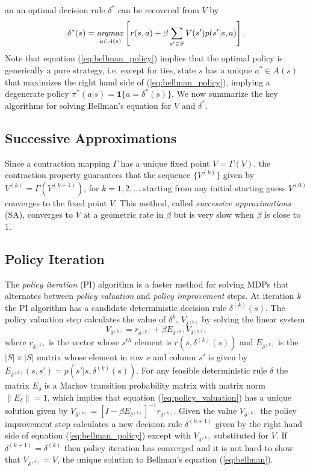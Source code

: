 an an optimal decision rule $\delta^*$ can be recovered from $V$ by
\begin{equation}
       \delta^*(s) = \mathop{\it argmax}_{a \in A(s)}\left[ r(s,a)+\beta \sum_{s' \in S} V(s')p(s'|s,a)\right].
\label{eq:bellman_policy}
\end{equation}
Note that equation (\ref{eq:bellman_policy}) implies that the optimal policy is generically a pure strategy, i.e. except for
ties, state $s$ has a unique $a^* \in A(s)$ that maximizes the right hand side of (\ref{eq:bellman_policy}), 
implying a degenerate policy $\pi^*(a|s)=\mathbf{1}\{a=\delta^*(s)\}$. 
We now summarize the key algorithms for solving Bellman's equation 
for  $V$ and $\delta^*$.


\subsection{Successive Approximations}

Since a contraction mapping $\Gamma$ has a unique fixed point $V=\Gamma(V)$, the contraction property guarantees that 
the sequence $\{V^{(k)}\}$ given by $V^{(k)}=\Gamma(V^{(k-1)})$, for $k=1,2,\ldots$ starting from
any initial starting guess $V^{(0)}$ converges to the fixed point $V$. This method,  called 
{\it successive approximations\/} (SA), converges to $V$ at a geometric rate in $\beta$ but is very slow when $\beta$ is close to 1. 

\subsection{Policy Iteration}

The \citet{Howard:1960} {\it policy iteration\/} (PI) algorithm is a faster method for solving MDPs that 
alternates between {\it policy valuation\/} and {\it policy improvement\/} steps. At iteration $k$ the PI algorithm has a candidate
deterministic decision rule $\delta^{(k)}(s)$. The policy valuation step calculates the value of $\delta^k$,  $V_{\delta^{(k)}}$ by solving the linear system
\begin{equation}
     V_{\delta^{(k)}} = r_{\delta^{(k)}} + \beta E_{\delta^{(k)}} V_{\delta^{(k)}},
\label{eq:policy_valuation}
\end{equation}
where $r_{\delta^{(k)}}$ is the vector whose $s^{th}$ element is $r(s,\delta^{(k)}(s))$ and $E_{\delta^{(k)}}$ is the $|S| \times |S|$ matrix whose
element in row $s$ and column $s'$ is given by $E_{\delta^{(k)}}(s,s')=p(s'|s,\delta^{(k)}(s))$. For any feasible deterministic rule $\delta$
the matrix $E_{\delta}$ is a Markov transition probability matrix with matrix norm $\|E_{\delta}\|=1$, which implies that equation (\ref{eq:policy_valuation})
has a unique solution given by $V_{\delta^{(k)}}=[I-\beta E_{\delta^{(k)}}]^{-1} r_{\delta^{(k)}}.$ Given the value $V_{\delta^{(k)}}$ the  policy improvement step
calculates a new decision rule $\delta^{(k+1)}$ given by the right hand side of equation (\ref{eq:bellman_policy}) except with $V_{\delta^{(k)}}$ substituted for $V$. 
If $\delta^{(k+1)}=\delta^{(k)}$ then policy iteration has converged and it is not hard to show that $V_{\delta^{(k)}}=V$, the unique solution to Bellman's equation (\ref{eq:bellman}).  

